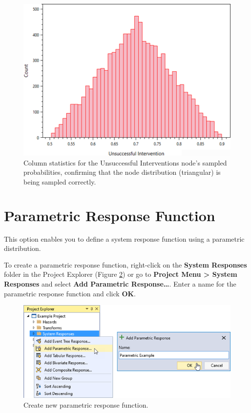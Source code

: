 \documentclass[
]{book}
\begin{document}
\begin{figure}

{\centering \includegraphics{images/figure99} 

}

\caption{Column statistics for the Unsuccessful Interventions node’s sampled probabilities, confirming that the node distribution (triangular) is being sampled correctly.}\label{fig:figure-99}
\end{figure}

\hypertarget{parametric-response-function}{%
\section{Parametric Response Function}\label{parametric-response-function}}

This option enables you to define a system response function using a parametric distribution.

To create a parametric response function, right-click on the \textbf{System Responses} folder in the Project Explorer (Figure \ref{fig:figure-100}) or go to \textbf{Project Menu \textgreater{} System Responses} and select \textbf{Add Parametric Response\ldots{}}. Enter a name for the parametric response function and click \textbf{OK}.

\begin{figure}

{\centering \includegraphics{images/figure100} 

}

\caption{Create new parametric response function.}\label{fig:figure-100}
\end{figure}
\end{document}
